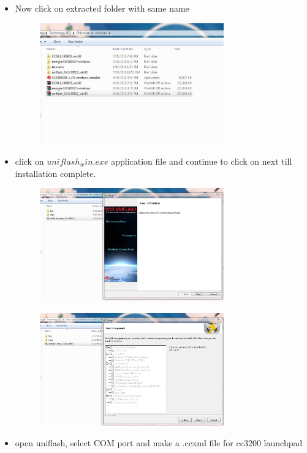 \documentclass[a4paper,12pt,oneside]{book}
\begin{document}
\begin{enumerate}
\begin{itemize}
\begin{figure}[h]
    	\end{figure}
    \item Now click on extracted folder with same name
    \begin{figure}[h]
    	\hspace{2cm}
    	\includegraphics[width=300px]{inst10}
    \end{figure}
    \newpage
    \item click on $uniflash_win.exe$ application file and continue to click on next till installation complete.
    \begin{figure}[h]
    	\hspace{2cm}
    	\includegraphics[width=300px]{inst11}
    \end{figure}
    \begin{figure}[h]
    	\hspace{2cm}
    	\includegraphics[width=300px]{inst12}
    \end{figure}
    \newpage
     \item open uniflash, select COM port and make a .ccxml file for cc3200 launchpad

\end{itemize}
\end{enumerate}
\end{document}
